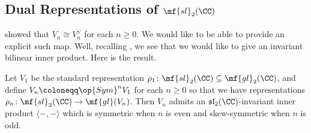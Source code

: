 \documentclass[../notes.tex]{subfiles}
\begin{document}
\subsection{Dual Representations of \texorpdfstring{$\mf{sl}_2(\CC)$}{sl2(C)}}
 showed that $V_n\cong V_n^\lor$ for each $n\ge0$. We would like to be able to provide an explicit such map. Well, recalling , we see that we would like to give an invariant bilinear inner product. Here is the result.
\begin{proposition}
	Let $V_1$ be the standard representation $\rho_1\colon\mf{sl}_2(\CC)\subseteq\mf{gl}_2(\CC)$, and define $V_n\coloneqq\op{Sym}^nV_1$ for each $n\ge0$ so that we have representations $\rho_n\colon\mf{sl}_2(\CC)\to\mf{gl}(V_n)$. Then $V_n$ admits an $\mathfrak{sl}_2(\CC)$-invariant inner product $\langle-,-\rangle$ which is symmetric when $n$ is even and skew-symmetric when $n$ is odd.
\end{proposition}
\end{document}
